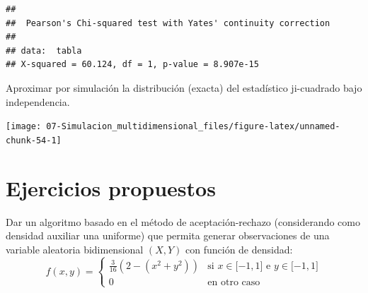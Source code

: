 \documentclass[]{book}
\newenvironment{Shaded}{\begin{snugshade}}{\end{snugshade}}
\newcommand{\KeywordTok}[1]{\textcolor[rgb]{0.13,0.29,0.53}{\textbf{#1}}}
\newcommand{\DataTypeTok}[1]{\textcolor[rgb]{0.13,0.29,0.53}{#1}}
\newcommand{\DecValTok}[1]{\textcolor[rgb]{0.00,0.00,0.81}{#1}}
\newcommand{\StringTok}[1]{\textcolor[rgb]{0.31,0.60,0.02}{#1}}
\newcommand{\CommentTok}[1]{\textcolor[rgb]{0.56,0.35,0.01}{\textit{#1}}}
\newcommand{\OtherTok}[1]{\textcolor[rgb]{0.56,0.35,0.01}{#1}}
\newcommand{\ControlFlowTok}[1]{\textcolor[rgb]{0.13,0.29,0.53}{\textbf{#1}}}
\newcommand{\OperatorTok}[1]{\textcolor[rgb]{0.81,0.36,0.00}{\textbf{#1}}}
\newcommand{\NormalTok}[1]{#1}
\theoremstyle{definition}
\theoremstyle{definition}
\theoremstyle{definition}
\theoremstyle{remark}
\let\BeginKnitrBlock\begin \let\EndKnitrBlock\end
\begin{document}
\begin{verbatim}
## 
##  Pearson's Chi-squared test with Yates' continuity correction
## 
## data:  tabla
## X-squared = 60.124, df = 1, p-value = 8.907e-15
\end{verbatim}

\BeginKnitrBlock{exercise}
\protect\hypertarget{exr:unnamed-chunk-53}{}{\label{exr:unnamed-chunk-53} }
\EndKnitrBlock{exercise}

Aproximar por simulación la distribución (exacta) del estadístico
ji-cuadrado bajo independencia.

\begin{Shaded}
\end{Shaded}

\begin{center}\texttt{[image: 07-Simulacion\_multidimensional\_files/figure-latex/unnamed-chunk-54-1]} \end{center}

\section{Ejercicios propuestos}\label{ejercicios-propuestos}

\BeginKnitrBlock{exercise}
\protect\hypertarget{exr:unnamed-chunk-55}{}{\label{exr:unnamed-chunk-55} }
\EndKnitrBlock{exercise}

Dar un algoritmo basado en el método de aceptación-rechazo (considerando
como densidad auxiliar una uniforme) que permita generar observaciones
de una variable aleatoria bidimensional \(\left( X,Y\right)\) con
función de densidad: \[f(x,y)=\left\{ 
\begin{array}{cl}
\frac{3}{16}\left( 2-\left( x^2+y^2\right) \right)  & \text{si }x\in
\lbrack -1,1]\text{ e }y\in \lbrack -1,1] \\ 
0 & \text{en otro caso}
\end{array}
\right.\]
\end{document}
